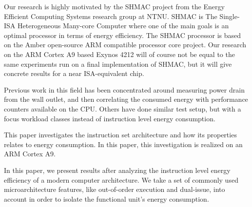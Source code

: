Our research is highly motivated by the SHMAC project from the Energy Efficient
Computing Systems research group at NTNU. SHMAC is The Single-ISA Heterogeneous
Many-core Computer where one of the main goals is an optimal processor in terms
of energy efficiency. The SHMAC processor is based on the Amber open-source ARM
compatible processor core project. Our research on the ARM Cortex A9
based Exynos 4212 will of course not be equal to the same experiments run on
a final implementation of SHMAC, but it will give concrete results for a near
ISA-equivalent chip.

Previous work in this field has been concentrated around measuring power drain
from the wall outlet, and then correlating the consumed energy with performance
counters available on the CPU\cite{singh}\cite{bertran}\cite{bircher}. Others
have done similar test setup, but with a focus workload classes instead of
instruction level energy consumption\cite{carroll2010analysis}.


This paper investigates the instruction set architecture and how its properties
relates to energy consumption. In this paper, this investigation is realized on
an ARM Cortex A9.

In this paper, we present results after analyzing the instruction level energy
efficiency of a modern computer architecture. We take a set of commonly used
microarchitecture features, like out-of-order execution and dual-issue, into
account in order to isolate the functional unit's energy consumption.

